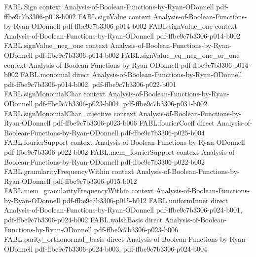 \begin{theorem}
\label{FABL.exercise5_33b_sameSigns}
\leanok
{}
\proofstep
  {FABL.Sign}
  {context}
  {Analysis-of-Boolean-Functions-by-Ryan-ODonnell}
  {pdf-ffbe9c7b3306-p018-b002}
\proofstep
  {FABL.signValue}
  {context}
  {Analysis-of-Boolean-Functions-by-Ryan-ODonnell}
  {pdf-ffbe9c7b3306-p014-b002}
\proofstep
  {FABL.signValue_one}
  {context}
  {Analysis-of-Boolean-Functions-by-Ryan-ODonnell}
  {pdf-ffbe9c7b3306-p014-b002}
\proofstep
  {FABL.signValue_neg_one}
  {context}
  {Analysis-of-Boolean-Functions-by-Ryan-ODonnell}
  {pdf-ffbe9c7b3306-p014-b002}
\proofstep
  {FABL.signValue_eq_neg_one_or_one}
  {context}
  {Analysis-of-Boolean-Functions-by-Ryan-ODonnell}
  {pdf-ffbe9c7b3306-p014-b002}
\proofstep
  {FABL.monomial}
  {direct}
  {Analysis-of-Boolean-Functions-by-Ryan-ODonnell}
  {pdf-ffbe9c7b3306-p014-b002,
    pdf-ffbe9c7b3306-p022-b001}
\proofstep
  {FABL.signMonomialChar}
  {context}
  {Analysis-of-Boolean-Functions-by-Ryan-ODonnell}
  {pdf-ffbe9c7b3306-p023-b004,
    pdf-ffbe9c7b3306-p031-b002}
\proofstep
  {FABL.signMonomialChar_injective}
  {context}
  {Analysis-of-Boolean-Functions-by-Ryan-ODonnell}
  {pdf-ffbe9c7b3306-p023-b006}
\proofstep
  {FABL.fourierCoeff}
  {direct}
  {Analysis-of-Boolean-Functions-by-Ryan-ODonnell}
  {pdf-ffbe9c7b3306-p025-b004}
\proofstep
  {FABL.fourierSupport}
  {context}
  {Analysis-of-Boolean-Functions-by-Ryan-ODonnell}
  {pdf-ffbe9c7b3306-p022-b002}
\proofstep
  {FABL.mem_fourierSupport}
  {context}
  {Analysis-of-Boolean-Functions-by-Ryan-ODonnell}
  {pdf-ffbe9c7b3306-p022-b002}
\proofstep
  {FABL.granularityFrequencyWithin}
  {context}
  {Analysis-of-Boolean-Functions-by-Ryan-ODonnell}
  {pdf-ffbe9c7b3306-p015-b012}
\proofstep
  {FABL.mem_granularityFrequencyWithin}
  {context}
  {Analysis-of-Boolean-Functions-by-Ryan-ODonnell}
  {pdf-ffbe9c7b3306-p015-b012}
\proofstep
  {FABL.uniformInner}
  {direct}
  {Analysis-of-Boolean-Functions-by-Ryan-ODonnell}
  {pdf-ffbe9c7b3306-p024-b001,
    pdf-ffbe9c7b3306-p024-b002}
\proofstep
  {FABL.walshBasis}
  {direct}
  {Analysis-of-Boolean-Functions-by-Ryan-ODonnell}
  {pdf-ffbe9c7b3306-p023-b006}
\proofstep
  {FABL.parity_orthonormal_basis}
  {direct}
  {Analysis-of-Boolean-Functions-by-Ryan-ODonnell}
  {pdf-ffbe9c7b3306-p024-b003,
    pdf-ffbe9c7b3306-p024-b004}
\proofstep

\end{theorem}
